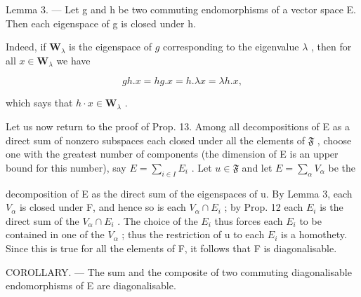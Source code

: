 Lemma 3. --- Let g and h be two commuting endomorphisms of a vector space E. Then each eigenspace of g is closed under h.

Indeed, if \(\mathbf{W}_{\lambda}\) is the eigenspace of \(g\) corresponding to the eigenvalue \(\lambda\) , then for all \(x \in \mathbf{W}_{\lambda}\) we have

\[
g h. x = h g. x = h. \lambda x = \lambda h. x,
\]

which says that \(h \cdot x \in \mathbf{W}_{\lambda}\) .

Let us now return to the proof of Prop. 13. Among all decompositions of E as a direct sum of nonzero subspaces each closed under all the elements of \(\mathfrak{F}\) , choose one with the greatest number of components (the dimension of E is an upper bound for this number), say \(E = \sum_{i\in I}E_i\) . Let \(u\in \mathfrak{F}\) and let \(E = \sum_{\alpha}V_{\alpha}\) be the

decomposition of E as the direct sum of the eigenspaces of u. By Lemma 3, each \(V_{\alpha}\) is closed under F, and hence so is each \(V_{\alpha} \cap E_{i}\) ; by Prop. 12 each \(E_{i}\) is the direct sum of the \(V_{\alpha} \cap E_{i}\) . The choice of the \(E_{i}\) thus forces each \(E_{i}\) to be contained in one of the \(V_{\alpha}\) ; thus the restriction of u to each \(E_{i}\) is a homothety. Since this is true for all the elements of F, it follows that F is diagonalisable.

COROLLARY. --- The sum and the composite of two commuting diagonalisable endomorphisms of E are diagonalisable.

